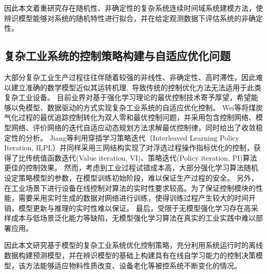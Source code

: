 因此本文着重研究存在随机性、非确定性的复杂系统连续时间域系统建模方法，使辨识模型能够对系统的随机特性进行拟合，并在给定观测数据下评估系统的非确定性。

\subsection{复杂工业系统的控制策略构建与自适应优化问题}
大部分复杂工业生产过程往往伴随着较强的非线性、非确定性、高时滞性，因此难以建立准确的数学模型近似其运转机理, 导致传统的控制优化方法无法适用于此类复杂工业设备。
目前业界对基于强化学习理论的最优控制技术\cite{Sutton2018}\cite{F.L.LewisD.Vrabie2012}寄予厚望，希望能够以免模型、数据驱动的方式实现复杂工业系统的自适应优化控制。
Wei等\cite{Wei2014}将煤炭气化过程的最优追踪控制转化为双人零和最优控制问题，并采用包含控制网络、模型网络、评价网络的迭代自适应动态规划方法求解最优控制律，同时给出了收敛稳定性的分析。
Jiang等\cite{Jiang2018}利用穿插学习策略迭代（Interleaved Learning
Policy Iteration, ILPL）并同样采用三网结构实现了对浮选过程操作指标优化的控制，获得了比传统值函数迭代(Value iteration, VI)、策略迭代(Policy iteration, PI)算法更佳的控制效果。
然而，考虑到工业过程试错成本高，大部分强化学习算法随机设定策略模型的参数，在模型训练初始阶段，难以保证生产过程的安全。
另外，在工业场景下进行设备在线控制对算法的实时性要求较高。为了保证控制模块的性能，需要采用实时生成的数据对网络进行训练，使得训练过程产生较大的时间开销，模型更新与推理的实时性难以保证。
最后，受限于无模型强化学习存在高采样成本与低场景泛化能力等缺陷，无模型强化学习算法在真实的工业实践中难以部署应用。

因此本文研究基于模型的复杂工业系统优化控制策略，充分利用系统运行时的离线数据构建预测模型，并在辨识模型的基础上构建具有在线自学习能力的控制决策模型，该方法能够适应物料性质改变、设备老化等被控系统不断变化的情况。

